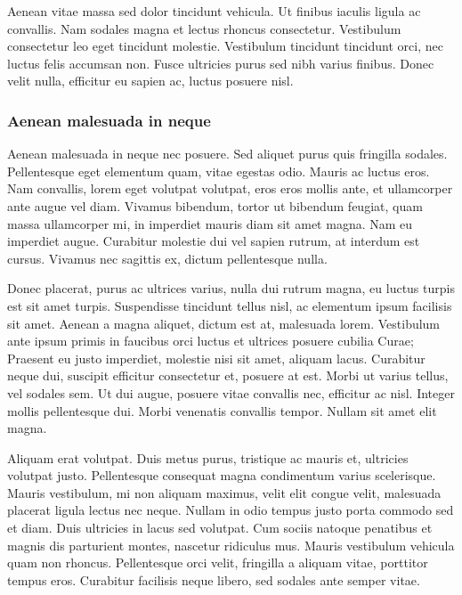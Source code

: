 Aenean vitae massa sed dolor tincidunt vehicula.
Ut finibus iaculis ligula ac convallis.
Nam sodales magna et lectus rhoncus consectetur.
Vestibulum consectetur leo eget tincidunt molestie.
Vestibulum tincidunt tincidunt orci, nec luctus felis accumsan non.
Fusce ultricies purus sed nibh varius finibus.
Donec velit nulla, efficitur eu sapien ac, luctus posuere nisl.

\subsubsection{Aenean malesuada in neque}

Aenean malesuada in neque nec posuere.
Sed aliquet purus quis fringilla sodales.
Pellentesque eget elementum quam, vitae egestas odio.
Mauris ac luctus eros.
Nam convallis, lorem eget volutpat volutpat, eros eros mollis ante, et ullamcorper ante augue vel diam.
Vivamus bibendum, tortor ut bibendum feugiat, quam massa ullamcorper mi, in imperdiet mauris diam sit amet magna.
Nam eu imperdiet augue.
Curabitur molestie dui vel sapien rutrum, at interdum est cursus.
Vivamus nec sagittis ex, dictum pellentesque nulla.

Donec placerat, purus ac ultrices varius, nulla dui rutrum magna, eu luctus turpis est sit amet turpis.
Suspendisse tincidunt tellus nisl, ac elementum ipsum facilisis sit amet.
Aenean a magna aliquet, dictum est at, malesuada lorem.
Vestibulum ante ipsum primis in faucibus orci luctus et ultrices posuere cubilia Curae; Praesent eu justo imperdiet, molestie nisi sit amet, aliquam lacus.
Curabitur neque dui, suscipit efficitur consectetur et, posuere at est.
Morbi ut varius tellus, vel sodales sem.
Ut dui augue, posuere vitae convallis nec, efficitur ac nisl.
Integer mollis pellentesque dui.
Morbi venenatis convallis tempor.
Nullam sit amet elit magna.

Aliquam erat volutpat.
Duis metus purus, tristique ac mauris et, ultricies volutpat justo.
Pellentesque consequat magna condimentum varius scelerisque.
Mauris vestibulum, mi non aliquam maximus, velit elit congue velit, malesuada placerat ligula lectus nec neque.
Nullam in odio tempus justo porta commodo sed et diam.
Duis ultricies in lacus sed volutpat.
Cum sociis natoque penatibus et magnis dis parturient montes, nascetur ridiculus mus.
Mauris vestibulum vehicula quam non rhoncus.
Pellentesque orci velit, fringilla a aliquam vitae, porttitor tempus eros.
Curabitur facilisis neque libero, sed sodales ante semper vitae.
